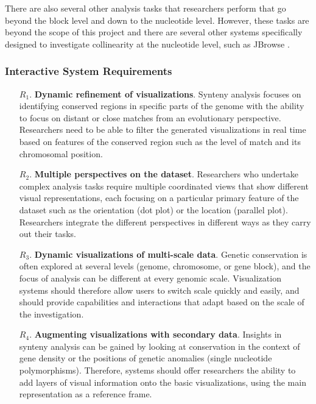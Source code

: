 There are also several other analysis tasks that researchers perform that go beyond the block level and down to the nucleotide level. However, these tasks are beyond the scope of this project and there are several other systems specifically designed to investigate collinearity at the nucleotide level, such as JBrowse \cite{skinner2009jbrowse}.

\subsubsection{Interactive System Requirements}
 \begin{enumerate}
\item [$R_1$.] \textbf{Dynamic refinement of visualizations}. Synteny analysis focuses on identifying conserved regions in specific parts of the genome with the ability to focus on distant or close matches from an evolutionary perspective. Researchers need to be able to filter the generated visualizations in real time based on features of the conserved region such as the level of match and its chromosomal position. 

\item [$R_2$.] \textbf{Multiple perspectives on the dataset}. Researchers who undertake complex analysis tasks require multiple coordinated views that show different visual representations, each focusing on a particular primary feature of the dataset such as the orientation (dot plot) or the location (parallel plot). Researchers integrate the different perspectives in different ways as they carry out their tasks.

\item [$R_3$.] \textbf{Dynamic visualizations of multi-scale data}. Genetic conservation is often explored at several levels (genome, chromosome, or gene block), and the focus of analysis can be different at every genomic scale. Visualization systems should therefore allow users to switch scale quickly and easily, and should provide capabilities and interactions that adapt based on the scale of the investigation.

\item [$R_4$.] \textbf{Augmenting visualizations with secondary data}. Insights in synteny analysis can be gained by looking at conservation in the context of gene density or the positions of genetic anomalies (single nucleotide polymorphisms). Therefore, systems should offer researchers the ability to add layers of visual information onto the basic visualizations, using the main representation as a reference frame.


\end{enumerate}
